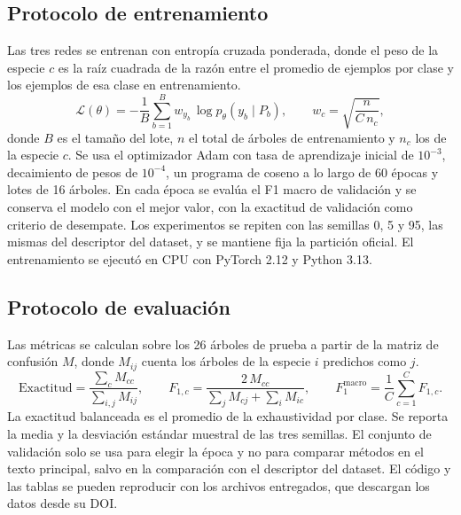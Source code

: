 \documentclass[preprint,12pt]{elsarticle}
\begin{document}
\subsection{Protocolo de entrenamiento}

Las tres redes se entrenan con entropía cruzada ponderada, donde el peso de la especie $c$ es la raíz cuadrada de la razón entre el promedio de ejemplos por clase y los ejemplos de esa clase en entrenamiento.
\begin{equation}
\mathcal{L}(\theta) = -\frac{1}{B}\sum_{b=1}^{B} w_{y_b}\,\log \hat{p}_\theta\!\left(y_b \mid P_b\right), \qquad w_c = \sqrt{\frac{n}{C\,n_c}},
\label{eq:loss}
\end{equation}
donde $B$ es el tamaño del lote, $n$ el total de árboles de entrenamiento y $n_c$ los de la especie $c$. Se usa el optimizador Adam \cite{kingma2015adam} con tasa de aprendizaje inicial de $10^{-3}$, decaimiento de pesos de $10^{-4}$, un programa de coseno a lo largo de 60 épocas y lotes de 16 árboles. En cada época se evalúa el F1 macro de validación y se conserva el modelo con el mejor valor, con la exactitud de validación como criterio de desempate. Los experimentos se repiten con las semillas 0, 5 y 95, las mismas del descriptor del dataset, y se mantiene fija la partición oficial. El entrenamiento se ejecutó en CPU con PyTorch 2.12 y Python 3.13.

\subsection{Protocolo de evaluación}

Las métricas se calculan sobre los 26 árboles de prueba a partir de la matriz de confusión $M$, donde $M_{ij}$ cuenta los árboles de la especie $i$ predichos como $j$.
\begin{equation}
\mathrm{Exactitud} = \frac{\sum_c M_{cc}}{\sum_{i,j} M_{ij}}, \qquad F_{1,c} = \frac{2\,M_{cc}}{\sum_j M_{cj} + \sum_i M_{ic}}, \qquad F_{1}^{\text{macro}} = \frac{1}{C}\sum_{c=1}^{C} F_{1,c}.
\label{eq:metrics}
\end{equation}
La exactitud balanceada es el promedio de la exhaustividad por clase. Se reporta la media y la desviación estándar muestral de las tres semillas. El conjunto de validación solo se usa para elegir la época y no para comparar métodos en el texto principal, salvo en la comparación con el descriptor del dataset. El código y las tablas se pueden reproducir con los archivos entregados, que descargan los datos desde su DOI.
\end{document}
